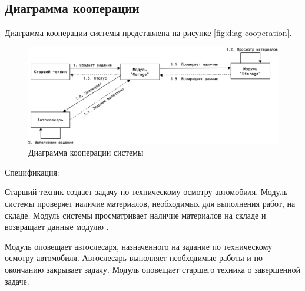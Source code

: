 \subsection{Диаграмма кооперации}
Диаграмма кооперации системы представлена на рисунке \ref{fig:diag-cooperation}.

\begin{figure}[H]
\centering
\includegraphics[keepaspectratio,width=\textwidth]{./images/aps.coursework-cooperation.png}
\caption{Диаграмма кооперации системы}
\label{fig:diag-caps.coursework-cooperation.pngooperation}
\end{figure}

Спецификация:

Старший техник создает задачу по техническому осмотру автомобиля. Модуль системы
 проверяет наличие материалов, необходимых для выполнения
работ, на складе. Модуль системы  просматривает наличие
материалов на складе и возвращает данные модулю .

Модуль  оповещает автослесаря, назначенного на задание по
техническому осмотру автомобиля. Автослесарь выполняет необходимые работы и по
окончанию закрывает задачу. Модуль  оповещает старшего техника
о завершенной задаче.
